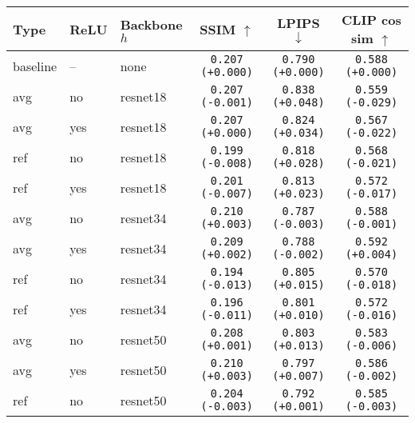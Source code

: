 \begin{tabular}{|l|l|l|c|c|c|}
\hline
Type & ReLU & Backbone $h$ & SSIM $\uparrow$ & LPIPS $\downarrow$ & CLIP cos sim $\uparrow$ \\
\hline
baseline & -- & none & \texttt{0.207} {\color{black}\texttt{(+0.000)}}& \texttt{0.790} {\color{black}\texttt{(+0.000)}} & \texttt{0.588} {\color{black}\texttt{(+0.000)}} \\
avg & no & resnet18 & \texttt{0.207} {\color{red}\texttt{(-0.001)}} & \texttt{0.838} {\color{red}\texttt{(+0.048)}} & \texttt{0.559} {\color{red}\texttt{(-0.029)}} \\
avg & yes & resnet18 & \texttt{0.207} {\color{green}\texttt{(+0.000)}} & \texttt{0.824} {\color{red}\texttt{(+0.034)}} & \texttt{0.567} {\color{red}\texttt{(-0.022)}} \\
ref & no & resnet18 & \texttt{0.199} {\color{red}\texttt{(-0.008)}} & \texttt{0.818} {\color{red}\texttt{(+0.028)}} & \texttt{0.568} {\color{red}\texttt{(-0.021)}} \\
ref & yes & resnet18 & \texttt{0.201} {\color{red}\texttt{(-0.007)}} & \texttt{0.813} {\color{red}\texttt{(+0.023)}} & \texttt{0.572} {\color{red}\texttt{(-0.017)}} \\
avg & no & resnet34 & \texttt{0.210} {\color{green}\texttt{(+0.003)}} & \texttt{0.787} {\color{green}\texttt{(-0.003)}} & \texttt{0.588} {\color{red}\texttt{(-0.001)}} \\
avg & yes & resnet34 & \texttt{0.209} {\color{green}\texttt{(+0.002)}} & \texttt{0.788} {\color{green}\texttt{(-0.002)}} & \texttt{0.592} {\color{green}\texttt{(+0.004)}} \\
ref & no & resnet34 & \texttt{0.194} {\color{red}\texttt{(-0.013)}} & \texttt{0.805} {\color{red}\texttt{(+0.015)}} & \texttt{0.570} {\color{red}\texttt{(-0.018)}} \\
ref & yes & resnet34 & \texttt{0.196} {\color{red}\texttt{(-0.011)}} & \texttt{0.801} {\color{red}\texttt{(+0.010)}} & \texttt{0.572} {\color{red}\texttt{(-0.016)}} \\
avg & no & resnet50 & \texttt{0.208} {\color{green}\texttt{(+0.001)}} & \texttt{0.803} {\color{red}\texttt{(+0.013)}} & \texttt{0.583} {\color{red}\texttt{(-0.006)}} \\
avg & yes & resnet50 & \texttt{0.210} {\color{green}\texttt{(+0.003)}} & \texttt{0.797} {\color{red}\texttt{(+0.007)}} & \texttt{0.586} {\color{red}\texttt{(-0.002)}} \\
ref & no & resnet50 & \texttt{0.204} {\color{red}\texttt{(-0.003)}} & \texttt{0.792} {\color{red}\texttt{(+0.001)}} & \texttt{0.585} {\color{red}\texttt{(-0.003)}} \\

\end{tabular}
